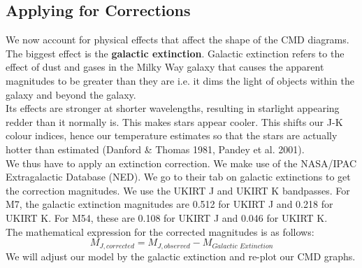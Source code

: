 \documentclass[12pt]{article}
\begin{document}
		\subsection{Applying for Corrections}
		We now account for physical effects that affect the shape of the CMD diagrams. The biggest effect is the \textbf{galactic extinction}. Galactic extinction refers to the effect of dust and gases in the Milky Way galaxy that causes the apparent magnitudes to be greater than they are i.e. it dims the light of objects within the galaxy and beyond the galaxy.\\
		Its effects are stronger at shorter wavelengths, resulting in starlight appearing redder than it normally is. This makes stars appear cooler. This shifts our J-K colour indices, hence our temperature estimates so that the stars are actually hotter than estimated (Danford \& Thomas 1981, Pandey et al.  2001).\\
		We thus have to apply an extinction correction. We make use of the NASA/IPAC Extragalactic Database (NED). We go to their tab on galactic extinctions to get the correction magnitudes. We use the UKIRT J and UKIRT K bandpasses. For M7, the galactic extinction magnitudes are 0.512 for UKIRT J and 0.218 for UKIRT K. For M54, these are 0.108 for UKIRT J and 0.046 for UKIRT K.\\
		The mathematical expression for the corrected magnitudes is as follows:
		\[M_{J, corrected} = M_{J, observed} - M_{Galactic \,\, Extinction}\]
		We will adjust our model by the galactic extinction and re-plot our CMD graphs.
\end{document}
